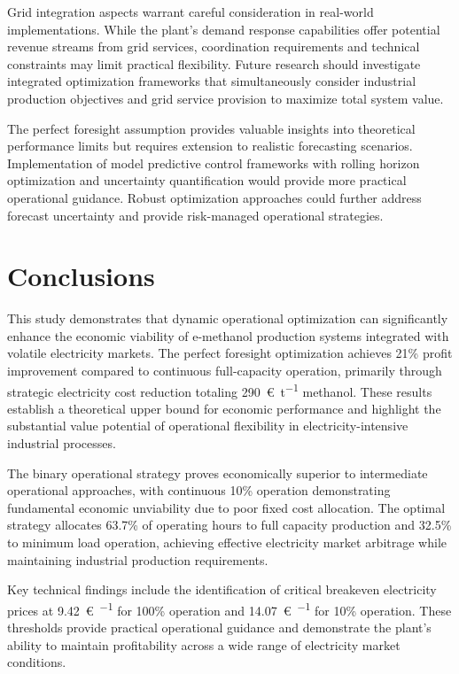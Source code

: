 \documentclass[12pt,a4paper]{article}
\begin{document}
Grid integration aspects warrant careful consideration in real-world implementations. While the plant's demand response capabilities offer potential revenue streams from grid services, coordination requirements and technical constraints may limit practical flexibility. Future research should investigate integrated optimization frameworks that simultaneously consider industrial production objectives and grid service provision to maximize total system value.

The perfect foresight assumption provides valuable insights into theoretical performance limits but requires extension to realistic forecasting scenarios. Implementation of model predictive control frameworks with rolling horizon optimization and uncertainty quantification would provide more practical operational guidance. Robust optimization approaches could further address forecast uncertainty and provide risk-managed operational strategies.

\section{Conclusions}

This study demonstrates that dynamic operational optimization can significantly enhance the economic viability of e-methanol production systems integrated with volatile electricity markets. The perfect foresight optimization achieves 21\% profit improvement compared to continuous full-capacity operation, primarily through strategic electricity cost reduction totaling \SI{290}{\euro\per\tonne} methanol. These results establish a theoretical upper bound for economic performance and highlight the substantial value potential of operational flexibility in electricity-intensive industrial processes.

The binary operational strategy proves economically superior to intermediate operational approaches, with continuous 10\% operation demonstrating fundamental economic unviability due to poor fixed cost allocation. The optimal strategy allocates 63.7\% of operating hours to full capacity production and 32.5\% to minimum load operation, achieving effective electricity market arbitrage while maintaining industrial production requirements.

Key technical findings include the identification of critical breakeven electricity prices at \SI{9.42}{\euro\per\MWh} for 100\% operation and \SI{14.07}{\euro\per\MWh} for 10\% operation. These thresholds provide practical operational guidance and demonstrate the plant's ability to maintain profitability across a wide range of electricity market conditions.
\end{document}
